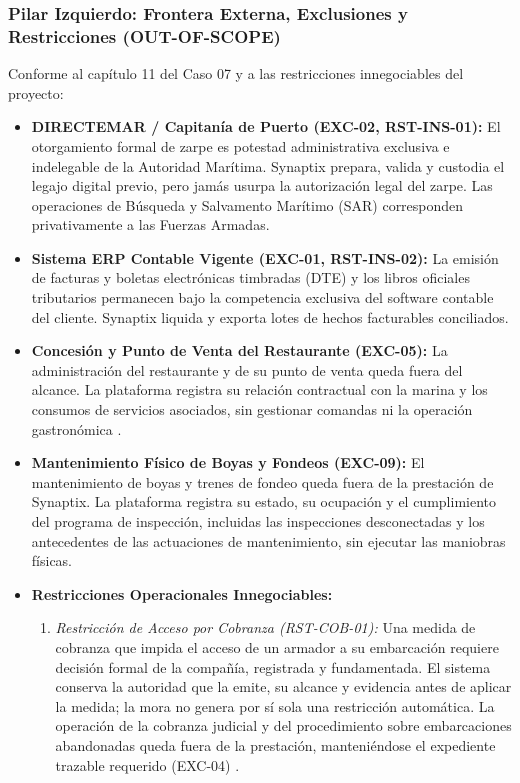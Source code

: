 \subsubsection{Pilar Izquierdo: Frontera Externa, Exclusiones y Restricciones (OUT-OF-SCOPE)}
Conforme al capítulo 11 del Caso 07 y a las restricciones innegociables del proyecto:
\begin{itemize}
    \item \textbf{DIRECTEMAR / Capitanía de Puerto (EXC-02, RST-INS-01):} El otorgamiento formal de zarpe es potestad administrativa exclusiva e indelegable de la Autoridad Marítima. Synaptix prepara, valida y custodia el legajo digital previo, pero jamás usurpa la autorización legal del zarpe. Las operaciones de Búsqueda y Salvamento Marítimo (SAR) corresponden privativamente a las Fuerzas Armadas.
    \item \textbf{Sistema ERP Contable Vigente (EXC-01, RST-INS-02):} La emisión de facturas y boletas electrónicas timbradas (DTE) y los libros oficiales tributarios permanecen bajo la competencia exclusiva del software contable del cliente. Synaptix liquida y exporta lotes de hechos facturables conciliados.
    \item \textbf{Concesión y Punto de Venta del Restaurante (EXC-05):} La administración del restaurante y de su punto de venta queda fuera del alcance. La plataforma registra su relación contractual con la marina y los consumos de servicios asociados, sin gestionar comandas ni la operación gastronómica \parencite[cap.~11]{caso07}.
    \item \textbf{Mantenimiento Físico de Boyas y Fondeos (EXC-09):} El mantenimiento de boyas y trenes de fondeo queda fuera de la prestación de Synaptix. La plataforma registra su estado, su ocupación y el cumplimiento del programa de inspección, incluidas las inspecciones desconectadas y los antecedentes de las actuaciones de mantenimiento, sin ejecutar las maniobras físicas.
    \item \textbf{Restricciones Operacionales Innegociables:}
    \begin{enumerate}[label=(\alph*)]
        \item \emph{Restricción de Acceso por Cobranza (RST-COB-01):} Una medida de cobranza que impida el acceso de un armador a su embarcación requiere decisión formal de la compañía, registrada y fundamentada. El sistema conserva la autoridad que la emite, su alcance y evidencia antes de aplicar la medida; la mora no genera por sí sola una restricción automática. La operación de la cobranza judicial y del procedimiento sobre embarcaciones abandonadas queda fuera de la prestación, manteniéndose el expediente trazable requerido (EXC-04) \parencite[caps.~10--11]{caso07}.   

\end{enumerate}
\end{itemize}
